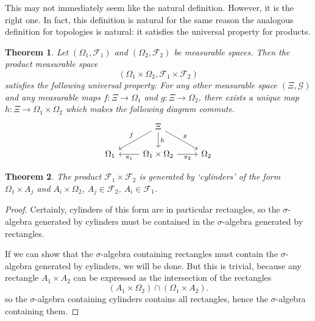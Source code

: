 \documentclass[a4paper]{scrartcl}
\theoremstyle{definition}
\theoremstyle{plain}
\newtheorem{theorem}{Theorem}[section]
\theoremstyle{remark}
\begin{document}
This may not immediately seem like the natural definition. However, it is the right one. In fact, this definition is natural for the same reason the analogous definition for topologies is natural: it satisfies the universal property for products.

\begin{theorem}
  \label{thm:universalpropertyforproductofmeasurablespaces}
  Let $(\Omega_{1}, \mathcal{F}_{1})$ and $(\Omega_{2}, \mathcal{F}_{2})$ be measurable spaces. Then the product measurable space
  \begin{equation*}
    (\Omega_{1} \times \Omega_{2}, \mathcal{F}_{1} \times \mathcal{F}_{2})
  \end{equation*}
  satisfies the following universal property: For any other measurable space $(\Xi, \mathcal{G})$ and any measurable maps $f\colon \Xi \to \Omega_{1}$ and $g\colon \Xi \to \Omega_{2}$, there exists a unique map $h\colon \Xi \to \Omega_{1} \times \Omega_{2}$ which makes the following diagram commute.
  \begin{equation*}
    \begin{tikzcd}
      & \Xi
      \arrow[dr, "g"]
      \arrow[dl, swap, "f"]
      \arrow[d, "h"]
      \\
      \Omega_{1}
      & \Omega_{1} \times \Omega_{2}
      \arrow[l, "\pi_{1}"]
      \arrow[r, swap, "\pi_{2}"]
      & \Omega_{2}
    \end{tikzcd}
  \end{equation*}
\end{theorem}

\begin{theorem}
  The product $\mathcal{F}_{1} \times \mathcal{F}_{2}$ is generated by `cylinders' of the form $\Omega_{1} \times A_{j}$ and $A_{i} \times \Omega_{2}$, $A_{j} \in \mathcal{F}_{2}$, $A_{i} \in \mathcal{F}_{1}$.
\end{theorem}
\begin{proof}
  Certainly, cylinders of this form are in particular rectangles, so the $\sigma$-algebra generated by cylinders must be contained in the $\sigma$-algebra generated by rectangles.

  If we can show that the $\sigma$-algebra containing rectangles must contain the $\sigma$-algebra generated by cylinders, we will be done. But this is trivial, because any rectangle $A_{1} \times A_{2}$ can be expressed as the intersection of the rectangles
  \begin{equation*}
    (A_{1} \times \Omega_{2}) \cap (\Omega_{1} \times A_{2}).
  \end{equation*}
  so the $\sigma$-algebra containing cylinders contains all rectangles, hence the $\sigma$-algebra containing them.
\end{proof}
\end{document}
